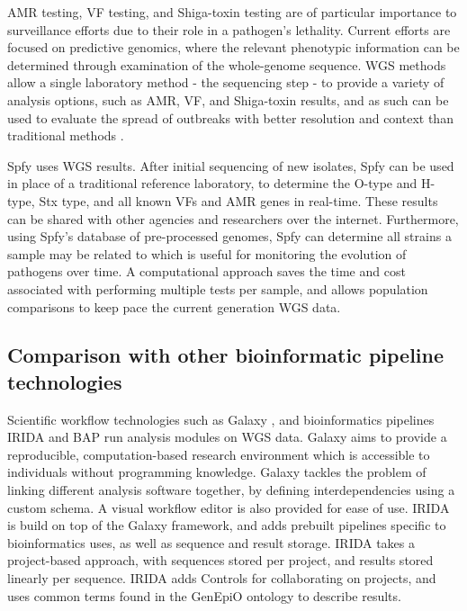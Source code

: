 \documentclass[a4,center,fleqn]{NAR}
\begin{document}
AMR testing, VF testing, and Shiga-toxin testing are of particular importance to surveillance efforts due to their role in a pathogen's lethality.
Current efforts are focused on predictive genomics, where the relevant phenotypic information can be determined through examination of the whole-genome sequence.
WGS methods allow a single laboratory method - the sequencing step - to provide a variety of analysis options, such as AMR, VF, and Shiga-toxin results, and as such can be used to evaluate the spread of outbreaks with better resolution and context than traditional methods \citep{ronholm2016navigating}.

Spfy uses WGS results.
After initial sequencing of new isolates, Spfy can be used in place of a traditional reference laboratory, to determine the O-type and H-type, Stx type, and all known VFs and AMR genes in real-time.
These results can be shared with other agencies and researchers over the internet.
Furthermore, using Spfy's database of pre-processed genomes, Spfy can determine all strains a sample may be related to which is useful for monitoring the evolution of pathogens over time.
A computational approach saves the time and cost associated with performing multiple tests per sample, and allows population comparisons to keep pace the current generation WGS data.

\subsection{Comparison with other bioinformatic pipeline technologies}

Scientific workflow technologies such as Galaxy \citep{goecks2010galaxy}, and bioinformatics pipelines IRIDA and BAP run analysis modules on WGS data.
Galaxy aims to provide a reproducible, computation-based research environment which is accessible to individuals without programming knowledge. Galaxy tackles the problem of linking different analysis software together, by defining interdependencies using a custom schema. A visual workflow editor is also provided for ease of use.
IRIDA is build on top of the Galaxy framework, and adds prebuilt pipelines specific to bioinformatics uses, as well as sequence and result storage. IRIDA takes a project-based approach, with sequences stored per project, and results stored linearly per sequence. IRIDA adds Controls for collaborating on projects, and uses common terms found in the GenEpiO ontology to describe results.
\end{document}

